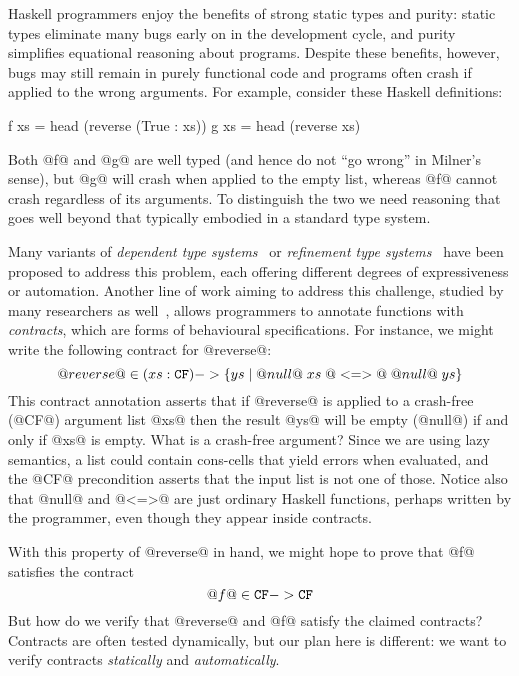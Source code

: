 Haskell programmers enjoy the benefits of strong static types and purity: 
static types eliminate many bugs early on in the development cycle, and purity 
simplifies equational reasoning about programs. Despite these benefits, however, 
bugs may still remain in purely functional code and programs often
crash if applied to the wrong arguments. 
For example, consider these Haskell definitions:
\begin{code}
  f xs = head (reverse (True : xs))
  g xs = head (reverse xs)
\end{code}
Both @f@ and @g@ are well typed (and hence do not ``go wrong'' in Milner's 
sense), but @g@ will crash when applied to the empty list, whereas @f@
cannot crash regardless of its arguments.
To distinguish the two we need reasoning that goes well beyond 
that typically embodied in a standard type system.

Many variants of {\em dependent type systems}~\cite{norell:thesis,Xi:2007:DMA:1230756.1230759,fstar} or 
{\em refinement type systems}~\cite{Rondon:2008:LT:1375581.1375602,Knowles+:sage}
have been proposed to address this problem, each offering different degrees of 
expressiveness or automation. 
Another line of work aiming to address this challenge, studied by many researchers
as well~\cite{Findler:2002:CHF:581478.581484,Blume:2006:SCM:1166013.1166016,Knowles+:sage,Siek06gradualtyping,Wadler:2009:WPC:1532974.1532976}, allows programmers to annotate 
functions with {\em contracts}, which are forms of behavioural specifications.
For instance, we might write the following contract for 
@reverse@: 
\[ @reverse@ \in (xs : {\tt CF}) -> \{ ys \mid @null@\;xs\; @<=>@\; @null@\;ys \}  \] 
This contract annotation asserts that if @reverse@ is applied to a 
crash-free (@CF@) argument list @xs@ then the result @ys@ will be empty (@null@) 
if and only if @xs@ is empty. What is a crash-free argument? 
Since we are using lazy semantics, a list could contain cons-cells that yield 
errors when evaluated, and the @CF@ precondition asserts that the input list 
is not one of those.
Notice also that @null@ and @<=>@ are just ordinary Haskell functions, perhaps
written by the programmer, even though they appear inside contracts.

With this property of @reverse@ in hand, we might 
hope to prove that @f@ satisfies the contract
\[ @f@ \in {\tt CF} -> {\tt CF} \] 
But how do we verify that @reverse@ and @f@ satisfy the claimed
contracts? Contracts are often tested dynamically, but 
our plan here is different: we want to verify contracts \emph{statically} 
and \emph{automatically}. 

